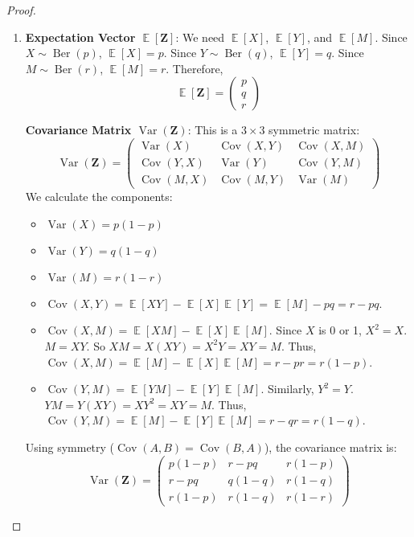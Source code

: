 \documentclass[11pt, a4paper]{article}
\DeclareMathOperator{\E}{\mathbb{E}}             %
\DeclareMathOperator{\Var}{\mathrm{Var}}         %
\DeclareMathOperator{\Cov}{\mathrm{Cov}}         %
\theoremstyle{definition}
\theoremstyle{remark}
\newcommand{\vect}[1]{\bm{#1}}          %
\begin{document}
\begin{proof}
\begin{enumerate}[label=(\alph*)]
    \item \textbf{Expectation Vector $\E[\vect{Z}]$}:
    We need $\E[X]$, $\E[Y]$, and $\E[M]$.
    Since $X \sim \operatorname{Ber}(p)$, $\E[X] = p$.
    Since $Y \sim \operatorname{Ber}(q)$, $\E[Y] = q$.
    Since $M \sim \operatorname{Ber}(r)$, $\E[M] = r$.
    Therefore,
    \[ \E[\vect{Z}] = \begin{pmatrix} p \\ q \\ r \end{pmatrix} \]

    \textbf{Covariance Matrix $\Var(\vect{Z})$}:
    This is a $3 \times 3$ symmetric matrix:
    \[ \Var(\vect{Z}) = \begin{pmatrix} \Var(X) & \Cov(X, Y) & \Cov(X, M) \\ \Cov(Y, X) & \Var(Y) & \Cov(Y, M) \\ \Cov(M, X) & \Cov(M, Y) & \Var(M) \end{pmatrix} \]
    We calculate the components:
    \begin{itemize}
        \item $\Var(X) = p(1-p)$
        \item $\Var(Y) = q(1-q)$
        \item $\Var(M) = r(1-r)$
        \item $\Cov(X, Y) = \E[XY] - \E[X]\E[Y] = \E[M] - pq = r - pq$.
        \item $\Cov(X, M) = \E[XM] - \E[X]\E[M]$. Since $X$ is 0 or 1, $X^2=X$. $M=XY$. So $XM = X(XY) = X^2Y = XY = M$. Thus, $\Cov(X, M) = \E[M] - \E[X]\E[M] = r - pr = r(1-p)$.
        \item $\Cov(Y, M) = \E[YM] - \E[Y]\E[M]$. Similarly, $Y^2=Y$. $YM = Y(XY) = XY^2 = XY = M$. Thus, $\Cov(Y, M) = \E[M] - \E[Y]\E[M] = r - qr = r(1-q)$.
    \end{itemize}
    Using symmetry ($\Cov(A, B) = \Cov(B, A)$), the covariance matrix is:
    \[ \Var(\vect{Z}) = \begin{pmatrix} p(1-p) & r - pq & r(1-p) \\ r - pq & q(1-q) & r(1-q) \\ r(1-p) & r(1-q) & r(1-r) \end{pmatrix} \]


\end{enumerate}
\end{proof}
\end{document}
